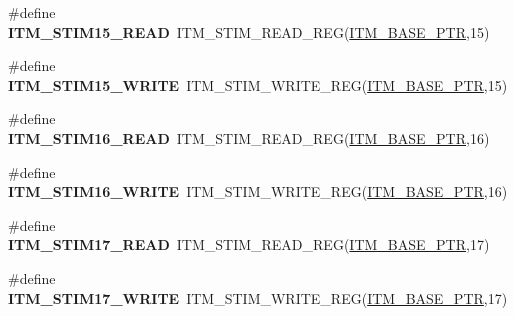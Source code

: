 \begin{DoxyCompactItemize}
\item 
\hypertarget{group___i_t_m___register___accessor___macros_ga3ea562a68b32ba37c430e0b6d2507075}{}\#define {\bfseries I\+T\+M\+\_\+\+S\+T\+I\+M15\+\_\+\+R\+E\+A\+D}~I\+T\+M\+\_\+\+S\+T\+I\+M\+\_\+\+R\+E\+A\+D\+\_\+\+R\+E\+G(\hyperlink{group___i_t_m___peripheral_gafaddee8fe8b6a898d4e5edc43ee0d703}{I\+T\+M\+\_\+\+B\+A\+S\+E\+\_\+\+P\+T\+R},15)\label{group___i_t_m___register___accessor___macros_ga3ea562a68b32ba37c430e0b6d2507075}

\item 
\hypertarget{group___i_t_m___register___accessor___macros_ga5363027769120ac7fd13164c60346eb1}{}\#define {\bfseries I\+T\+M\+\_\+\+S\+T\+I\+M15\+\_\+\+W\+R\+I\+T\+E}~I\+T\+M\+\_\+\+S\+T\+I\+M\+\_\+\+W\+R\+I\+T\+E\+\_\+\+R\+E\+G(\hyperlink{group___i_t_m___peripheral_gafaddee8fe8b6a898d4e5edc43ee0d703}{I\+T\+M\+\_\+\+B\+A\+S\+E\+\_\+\+P\+T\+R},15)\label{group___i_t_m___register___accessor___macros_ga5363027769120ac7fd13164c60346eb1}

\item 
\hypertarget{group___i_t_m___register___accessor___macros_ga9036d1cfac0837b32666e7cb353cfd95}{}\#define {\bfseries I\+T\+M\+\_\+\+S\+T\+I\+M16\+\_\+\+R\+E\+A\+D}~I\+T\+M\+\_\+\+S\+T\+I\+M\+\_\+\+R\+E\+A\+D\+\_\+\+R\+E\+G(\hyperlink{group___i_t_m___peripheral_gafaddee8fe8b6a898d4e5edc43ee0d703}{I\+T\+M\+\_\+\+B\+A\+S\+E\+\_\+\+P\+T\+R},16)\label{group___i_t_m___register___accessor___macros_ga9036d1cfac0837b32666e7cb353cfd95}

\item 
\hypertarget{group___i_t_m___register___accessor___macros_gace1ad469c70d11bf39a60780830605f3}{}\#define {\bfseries I\+T\+M\+\_\+\+S\+T\+I\+M16\+\_\+\+W\+R\+I\+T\+E}~I\+T\+M\+\_\+\+S\+T\+I\+M\+\_\+\+W\+R\+I\+T\+E\+\_\+\+R\+E\+G(\hyperlink{group___i_t_m___peripheral_gafaddee8fe8b6a898d4e5edc43ee0d703}{I\+T\+M\+\_\+\+B\+A\+S\+E\+\_\+\+P\+T\+R},16)\label{group___i_t_m___register___accessor___macros_gace1ad469c70d11bf39a60780830605f3}

\item 
\hypertarget{group___i_t_m___register___accessor___macros_ga3f00966b4f023808c0d22b5c88d9ad84}{}\#define {\bfseries I\+T\+M\+\_\+\+S\+T\+I\+M17\+\_\+\+R\+E\+A\+D}~I\+T\+M\+\_\+\+S\+T\+I\+M\+\_\+\+R\+E\+A\+D\+\_\+\+R\+E\+G(\hyperlink{group___i_t_m___peripheral_gafaddee8fe8b6a898d4e5edc43ee0d703}{I\+T\+M\+\_\+\+B\+A\+S\+E\+\_\+\+P\+T\+R},17)\label{group___i_t_m___register___accessor___macros_ga3f00966b4f023808c0d22b5c88d9ad84}

\item 
\hypertarget{group___i_t_m___register___accessor___macros_gab955a13756ae2b569880dbef823a29a4}{}\#define {\bfseries I\+T\+M\+\_\+\+S\+T\+I\+M17\+\_\+\+W\+R\+I\+T\+E}~I\+T\+M\+\_\+\+S\+T\+I\+M\+\_\+\+W\+R\+I\+T\+E\+\_\+\+R\+E\+G(\hyperlink{group___i_t_m___peripheral_gafaddee8fe8b6a898d4e5edc43ee0d703}{I\+T\+M\+\_\+\+B\+A\+S\+E\+\_\+\+P\+T\+R},17)\label{group___i_t_m___register___accessor___macros_gab955a13756ae2b569880dbef823a29a4}


\end{DoxyCompactItemize}
